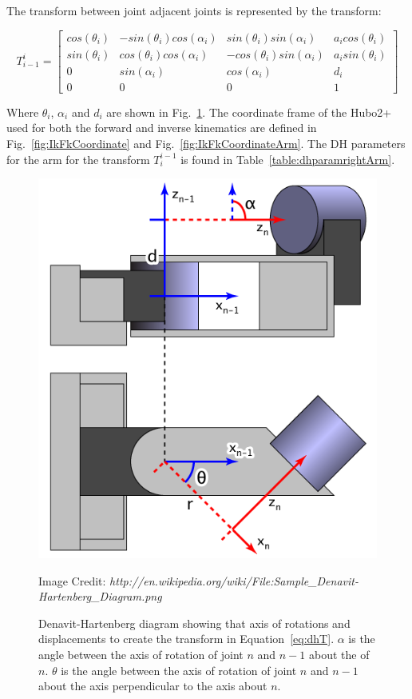 The transform between joint adjacent joints is represented by the transform:

\begin{equation}\label{eq:dhT}
T_{i-1}^{i} = \left[ \begin{array}{cccc} 
cos(\theta_i) & -sin(\theta_i)cos(\alpha_i) &  sin(\theta_i)sin(\alpha_i)  &  a_i cos(\theta_i) \\ 
sin(\theta_i) &  cos(\theta_i)cos(\alpha_i) & -cos(\theta_i)sin(\alpha_i)  &  a_i sin(\theta_i) \\
0             &  sin(\alpha_i)              &  cos(\alpha_i)               &  d_i               \\
0             &  0                          &  0                           &  1                 
\end{array} \right]
\end{equation}

Where $\theta_i$, $\alpha_i$ and $d_i$ are shown in Fig.~\ref{fig:dhDiagram}.  The coordinate frame of the Hubo2+ used for both the forward and inverse kinematics are defined in Fig.~\ref{fig:IkFkCoordinate} and Fig.~\ref{fig:IkFkCoordinateArm}.  The DH parameters for the arm for the transform $T_i^{i-1}$ is found in Table~\ref{table:dhparamrightArm}.

\begin{figure}[thpb]
  \centering
\includegraphics[width=0.5\columnwidth]{./examples/pix/Sample_Denavit-Hartenberg_Diagram.png}
\caption{Denavit-Hartenberg diagram showing that axis of rotations and displacements to create the transform in Equation~\ref{eq:dhT}.  $\alpha$ is the angle between the axis of rotation of joint $n$ and $n-1$ about the of $n$. $\theta$ is the angle between the axis of rotation of joint $n$ and $n-1$ about the axis perpendicular to the axis about $n$.}
Image Credit: \textit{http://en.wikipedia.org/wiki/File:Sample\_Denavit-Hartenberg\_Diagram.png}
\label{fig:dhDiagram}
\end{figure}


